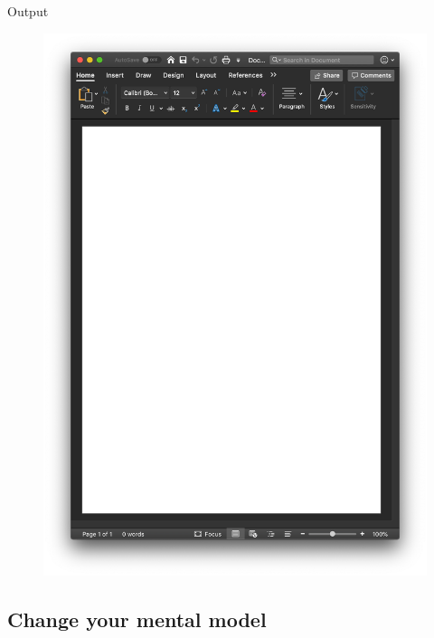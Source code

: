 \documentclass[
  letterpaper,
  DIV=11,
  numbers=noendperiod]{scrartcl}
\begin{document}
Output

\begin{figure}

{\centering \includegraphics[width=4.6875in,height=\textheight]{images/word.png}

}

\end{figure}

\hypertarget{change-your-mental-model-1}{%
\subsection{Change your mental model}\label{change-your-mental-model-1}}
\end{document}
